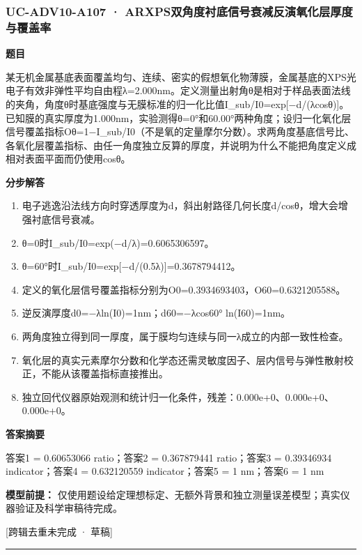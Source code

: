 \documentclass[UTF8,11pt,a4paper]{ctexart}
\begin{document}
\subsubsection*{UC-ADV10-A107 · ARXPS双角度衬底信号衰减反演氧化层厚度与覆盖率}
\noindent\textbf{题目}\par
某无机金属基底表面覆盖均匀、连续、密实的假想氧化物薄膜，金属基底的XPS光电子有效非弹性平均自由程λ=2.000nm。定义测量出射角θ是相对于样品表面法线的夹角，角度θ时基底强度与无膜标准的归一化比值I\_sub/I0=exp[−d/(λcosθ)]。已知膜的真实厚度为1.000nm，实验测得θ=0°和60.00°两种角度；设归一化氧化层信号覆盖指标Oθ=1−I\_sub/I0（不是氧的定量摩尔分数）。求两角度基底信号比、各氧化层覆盖指标、由任一角度独立反算的厚度，并说明为什么不能把角度定义成相对表面平面而仍使用cosθ。\par
\medskip\noindent\textbf{分步解答}
\begin{enumerate}
\item 电子逃逸沿法线方向时穿透厚度为d，斜出射路径几何长度d/cosθ，增大会增强衬底信号衰减。
\item θ=0时I\_sub/I0=exp(−d/λ)=0.6065306597。
\item θ=60°时I\_sub/I0=exp[−d/(0.5λ)]=0.3678794412。
\item 定义的氧化层信号覆盖指标分别为O0=0.3934693403，O60=0.6321205588。
\item 逆反演厚度d0=−λln(I0)=1nm；d60=−λcos60° ln(I60)=1nm。
\item 两角度独立得到同一厚度，属于膜均匀连续与同一λ成立的内部一致性检查。
\item 氧化层的真实元素摩尔分数和化学态还需灵敏度因子、层内信号与弹性散射校正，不能从该覆盖指标直接推出。
\item 独立回代仪器原始观测和统计归一化条件，残差：0.000e+0、0.000e+0、0.000e+0。
\end{enumerate}
\noindent\textbf{答案摘要}\par
答案1 = 0.60653066 ratio；答案2 = 0.367879441 ratio；答案3 = 0.39346934 indicator；答案4 = 0.632120559 indicator；答案5 = 1 nm；答案6 = 1 nm\par
\noindent\textbf{模型前提：}
仅使用题设给定理想标定、无额外背景和独立测量误差模型；真实仪器验证及科学审稿待完成。\par
\noindent\textcolor{red!65!black}{[跨辑去重未完成 · 草稿]} \par
\medskip\hrule\medskip
{}
\end{document}

